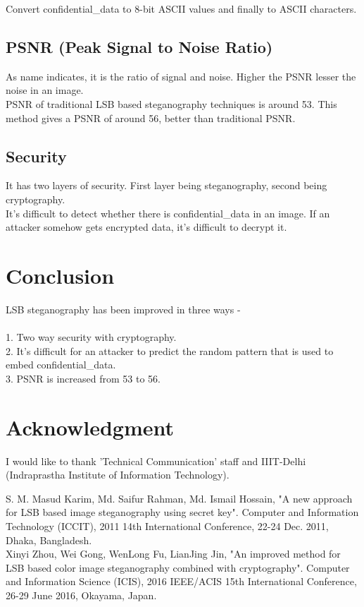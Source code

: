 \documentclass[conference]{IEEEtran}
\begin{document}
Convert confidential\_data to 8-bit ASCII values and finally to ASCII characters.\\
\subsection{PSNR (Peak Signal to Noise Ratio)}
As name indicates, it is the ratio of signal and noise.
Higher the PSNR lesser the noise in an image.\\

PSNR of traditional LSB based steganography techniques is around 53.
This method gives a PSNR of around 56, better than traditional PSNR.\\  
\subsection{Security}
It has two layers of security.
First layer being steganography, second being cryptography.\\

It's difficult to detect whether there is confidential\_data in an image.
If an attacker somehow gets encrypted data, it's difficult to decrypt it.\\
\section{Conclusion}
LSB steganography has been improved in three ways -\\ \\
1. Two way security with cryptography.\\
2. It's difficult for an attacker to predict the random pattern that is used to embed confidential\_data.\\
3. PSNR is increased from 53 to 56.\\
\section*{Acknowledgment}
I would like to thank 'Technical Communication' staff and IIIT-Delhi (Indraprastha Institute of Information Technology).\\

\begin{thebibliography}{00}
 S. M. Masud Karim, Md. Saifur Rahman, Md. Ismail Hossain, "A new approach for LSB based image steganography using secret key".  Computer and Information Technology (ICCIT), 2011 14th International Conference, 22-24 Dec. 2011, Dhaka, Bangladesh.\\
 Xinyi Zhou, Wei Gong, WenLong Fu, LianJing Jin, "An improved method for LSB based color image steganography combined with cryptography". Computer and Information Science (ICIS), 2016 IEEE/ACIS 15th International Conference, 26-29 June 2016, Okayama, Japan.\\
\end{thebibliography}
\end{document}
